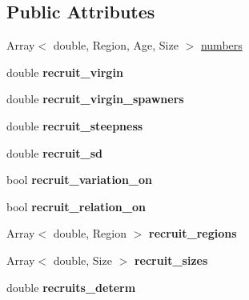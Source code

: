 \subsection*{Public Attributes}
\begin{DoxyCompactItemize}
\item 
Array$<$ double, Region, Age, Size $>$ \hyperlink{classIOSKJ_1_1Model_aa90edf75b7c9ebf8e50a30f3779b9664}{numbers}
\item 
\hypertarget{classIOSKJ_1_1Model_a686cbcc0d80f740b223f1f25b0869da7}{double {\bfseries recruit\-\_\-virgin}}\label{classIOSKJ_1_1Model_a686cbcc0d80f740b223f1f25b0869da7}

\item 
\hypertarget{classIOSKJ_1_1Model_a890862bf74f81155cfd527cec42752e4}{double {\bfseries recruit\-\_\-virgin\-\_\-spawners}}\label{classIOSKJ_1_1Model_a890862bf74f81155cfd527cec42752e4}

\item 
\hypertarget{classIOSKJ_1_1Model_a862b4466389406b47613ad56ab137d8e}{double {\bfseries recruit\-\_\-steepness}}\label{classIOSKJ_1_1Model_a862b4466389406b47613ad56ab137d8e}

\item 
\hypertarget{classIOSKJ_1_1Model_a2efdcaae859b3c94a3a0c6cd885b4fc2}{double {\bfseries recruit\-\_\-sd}}\label{classIOSKJ_1_1Model_a2efdcaae859b3c94a3a0c6cd885b4fc2}

\item 
\hypertarget{classIOSKJ_1_1Model_a0a9fb9908fa2eb8ab96630efc76267e7}{bool {\bfseries recruit\-\_\-variation\-\_\-on}}\label{classIOSKJ_1_1Model_a0a9fb9908fa2eb8ab96630efc76267e7}

\item 
\hypertarget{classIOSKJ_1_1Model_a2385640d3893a07f67ec1bd2e07a9c8b}{bool {\bfseries recruit\-\_\-relation\-\_\-on}}\label{classIOSKJ_1_1Model_a2385640d3893a07f67ec1bd2e07a9c8b}

\item 
\hypertarget{classIOSKJ_1_1Model_a39e8570fc684498461ba6b9983bae0f1}{Array$<$ double, Region $>$ {\bfseries recruit\-\_\-regions}}\label{classIOSKJ_1_1Model_a39e8570fc684498461ba6b9983bae0f1}

\item 
\hypertarget{classIOSKJ_1_1Model_a73219276650abc075d7cfbf164083b67}{Array$<$ double, Size $>$ {\bfseries recruit\-\_\-sizes}}\label{classIOSKJ_1_1Model_a73219276650abc075d7cfbf164083b67}

\item 
\hypertarget{classIOSKJ_1_1Model_ad2450f5604c657cbe259b7b49e8f905a}{double {\bfseries recruits\-\_\-determ}}\label{classIOSKJ_1_1Model_ad2450f5604c657cbe259b7b49e8f905a}


\end{DoxyCompactItemize}

